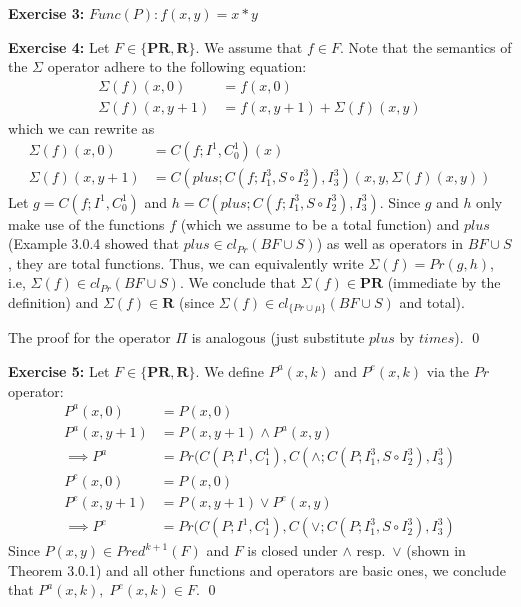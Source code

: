 \documentclass [11pt]{article}
\newcommand{\PR}{\textbf{PR}}
\newcommand{\R}{\textbf{R}}
\begin{document}
\bigskip
\noindent
\textbf{Exercise 3:}
$Func(P): f(x,y) = x*y$

\bigskip
\noindent
\textbf{Exercise 4:}
Let $F \in \{\PR, \R\}$. 
We assume that $f \in F$.
Note that the semantics of the $\Sigma$ operator adhere to the following equation:
\begin{align*}
\Sigma(f)(x,0) &= f(x,0) \\
\Sigma(f)(x, y+1) &= f(x,y+1) + \Sigma(f)(x,y)
\end{align*}
which we can rewrite as
\begin{align*}
\Sigma(f)(x,0) &= C(f; I^1, C^1_0)(x) \\
\Sigma(f)(x, y+1) &= C(plus; C(f; I^3_1, S \circ I^3_2), I^3_3) (x,y, \Sigma(f)(x,y))
\end{align*}
Let $g = C(f; I^1, C^1_0)$ and $h = C(plus; C(f; I^3_1, S \circ I^3_2), I^3_3)$. 
Since $g$ and $h$ only make use of the functions $f$ (which we assume to be a total function) and $plus$ (Example 3.0.4 showed that $plus \in cl_{Pr}(BF\cup S)$) as well as operators in $BF \cup S$, they are total functions.
Thus, we can equivalently write $\Sigma(f) = Pr(g, h)$, i.e, $\Sigma(f) \in cl_{Pr}(BF \cup S)$. 
We conclude that $\Sigma(f) \in \PR$ (immediate by the definition) and $\Sigma(f) \in \R$ (since $\Sigma(f) \in cl_{\{Pr \cup \mu \}}(BF \cup S)$ and total). 

\medskip
\noindent
The proof for the operator $\Pi$ is analogous (just substitute $plus$ by $times$).
\qed


\bigskip
\noindent
\textbf{Exercise 5:}
Let $F \in \{\PR, \R\}$. 
We define $P^a(x,k)$ and $P^e(x,k)$ via the $Pr$ operator:
\begin{align*}
P^a(x, 0) &= P(x,0) \\
P^a(x, y+1) &= P(x,y+1) \land P^a(x,y) \\
\implies P^a &= Pr(C(P; I^1, C^1_1),  C(\land; C(P; I^3_1, S \circ I^3_2), I^3_3) 
\end{align*}
\begin{align*}
P^e(x, 0) &= P(x,0) \\
P^e(x, y+1) &= P(x,y+1) \lor P^e(x,y) \\
\implies P^e &= Pr(C(P; I^1, C^1_1),  C(\lor; C(P; I^3_1, S \circ I^3_2), I^3_3) 
\end{align*}
Since $P(x,y) \in Pred^{k+1}(F)$ and $F$ is closed under $\land$ resp.~$\lor$ (shown in Theorem 3.0.1) and all other functions and operators are basic ones, we conclude that $P^a(x,k),\; P^e(x,k) \in F$.
\qed
\end{document}
